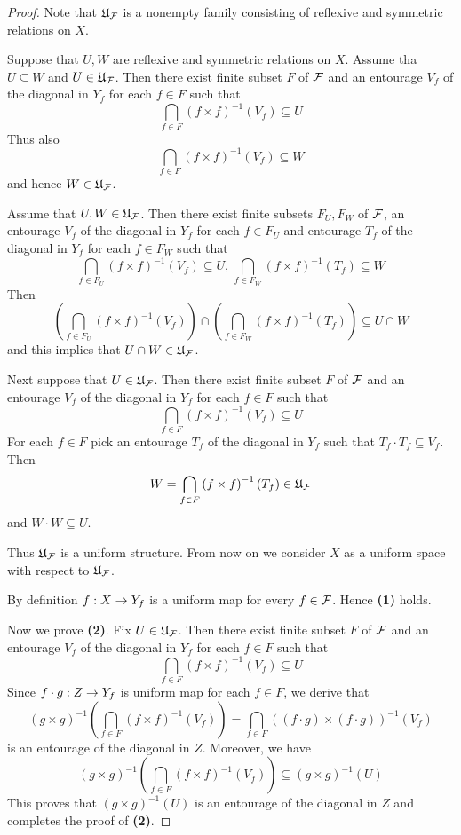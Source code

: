 \documentclass[10pt]{amsart}
\begin{document}
\begin{proof}
	Note that ${\mathfrak U}_{{\mathcal F}}$ is a nonempty family consisting of reflexive and symmetric relations on $X$.

	Suppose that $U,W$ are reflexive and symmetric relations on $X$. Assume tha $U\subseteq W$ and $U \in {\mathfrak U}_{{\mathcal F}}$. Then there exist finite subset $F$ of ${\mathcal F}$ and an entourage $V_f$ of the diagonal in $Y_f$ for each $f\in F$ such that
	$$\bigcap_{f\in F}\left(f\times f\right)^{-1}(V_f) \subseteq U$$
	Thus also
	$$\bigcap_{f\in F}\left(f\times f\right)^{-1}(V_f) \subseteq W$$
	and hence $W \in {\mathfrak U}_{{\mathcal F}}$.

	Assume that $U,W \in {\mathfrak U}_{{\mathcal F}}$. Then there exist finite subsets $F_U,F_W$ of ${\mathcal F}$, an entourage $V_f$ of the diagonal in $Y_f$ for each $f\in F_U$ and entourage $T_f$ of the diagonal in $Y_f$ for each $f\in F_W$ such that
	$$\bigcap_{f\in F_U}\left(f\times f\right)^{-1}(V_f) \subseteq U,\,\bigcap_{f\in F_W}\left(f\times f\right)^{-1}(T_f)\subseteq W$$
	Then
	$$\left(\bigcap_{f\in F_U}\left(f\times f\right)^{-1}(V_f) \right) \cap \left(\bigcap_{f \in F_W}\left(f\times f\right)^{-1}(T_f)\right)\subseteq U\cap W$$
	and this implies that $U\cap W \in {\mathfrak U}_{{\mathcal F}}$.

	Next suppose that $U \in {\mathfrak U}_{{\mathcal F}}$. Then there exist finite subset $F$ of ${\mathcal F}$ and an entourage $V_f$ of the diagonal in $Y_f$ for each $f\in F$ such that
	$$\bigcap_{f\in F}\left(f\times f\right)^{-1}(V_f) \subseteq U$$
	For each $f \in F$ pick an entourage $T_f$ of the diagonal in $Y_f$ such that $T_f\cdot T_f \subseteq V_f$. Then
	$$W = \bigcap_{f \in F}\left(f\times f\right)^{-1}(T_f) \in {\mathfrak U}_{{\mathcal F}}$$
	and $W\cdot W \subseteq U$.

	Thus ${\mathfrak U}_{{\mathcal F}}$ is a uniform structure. From now on we consider $X$ as a uniform space with respect to ${\mathfrak U}_{{\mathcal F}}$.

	By definition $f:X\rightarrow Y_f$ is a uniform map for every $f\in {\mathcal F}$. Hence \textbf{(1)} holds.

	Now we prove \textbf{(2)}. Fix $U \in {\mathfrak U}_{{\mathcal F}}$. Then there exist finite subset $F$ of ${\mathcal F}$ and an entourage $V_f$ of the diagonal in $Y_f$ for each $f\in F$ such that
	$$\bigcap_{f\in F}\left(f\times f\right)^{-1}(V_f) \subseteq U$$
	Since $f\cdot g:Z\rightarrow Y_f$ is uniform map for each $f \in F$, we derive that
	$$\left(g\times g\right)^{-1}\left(\bigcap_{f\in F}\left(f\times f\right)^{-1}\left(V_f\right)\right) = \bigcap_{f\in F}\left((f\cdot g)\times (f\cdot g)\right)^{-1}(V_f)$$
	is an entourage of the diagonal in $Z$. Moreover, we have
	$$\left(g\times g\right)^{-1}\left(\bigcap_{f\in F}\left(f\times f\right)^{-1}\left(V_f\right)\right) \subseteq \left(g\times g\right)^{-1}(U)$$
	This proves that $(g\times g)^{-1}(U)$ is an entourage of the diagonal in $Z$ and completes the proof of \textbf{(2)}.
\end{proof}
\end{document}
